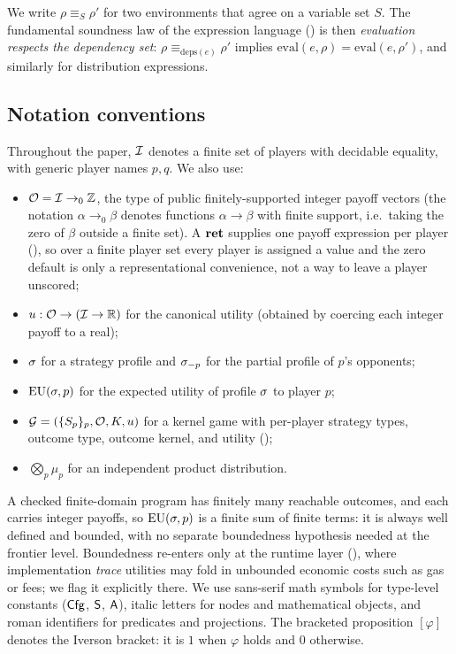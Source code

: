 We write $\rho \mathrel{\equiv_S} \rho'$ for two environments that
agree on a variable set $S$.  The fundamental soundness law of the
expression language () is then
\emph{evaluation respects the dependency set}:
$\rho \mathrel{\equiv_{\mathrm{deps}(e)}} \rho'$ implies
$\mathrm{eval}(e, \rho) = \mathrm{eval}(e, \rho')$, and similarly for
distribution expressions.

\subsection{Notation conventions}
\label{sec:prelim:notation}

Throughout the paper, $\mathcal{I}$ denotes a finite set of players with
decidable equality, with generic player names $p, q$.  We also use:
\begin{itemize}\itemsep1pt
\item $\mathcal{O} = \mathcal{I} \to_0 \mathbb{Z}$, the type of public
  finitely-supported integer payoff vectors (the notation
  $\alpha \to_0 \beta$ denotes functions $\alpha \to \beta$ with
  finite support, i.e.\ taking the zero of $\beta$ outside a
  finite set).  A $\mathbf{ret}$ supplies one payoff expression per player
  (), so over a finite player set every player is
  assigned a value and the zero default is only a representational
  convenience, not a way to leave a player unscored;
\item $u : \mathcal{O} \to (\mathcal{I} \to \mathbb{R})$ for the canonical
  utility (obtained by coercing each integer payoff to a real);
\item $\sigma$ for a strategy profile and $\sigma_{-p}$ for the
  partial profile of $p$'s opponents;
\item $\mathrm{EU}(\sigma, p)$ for the expected utility of profile
  $\sigma$ to player $p$;
\item $\mathcal{G} = (\{S_p\}_p, \mathcal{O}, K, u)$ for a kernel game with
  per-player strategy types, outcome type, outcome kernel, and
  utility ();
\item $\bigotimes_p \mu_p$ for an independent product distribution.
\end{itemize}
A checked finite-domain program has finitely many reachable outcomes, and
each carries integer payoffs, so $\mathrm{EU}(\sigma,p)$ is a finite sum of finite
terms: it is always well defined and bounded, with no separate boundedness
hypothesis needed at the frontier level.  Boundedness re-enters only at the
runtime layer (), where implementation \emph{trace}
utilities may fold in unbounded economic costs such as gas or fees; we flag it
explicitly there.
We use sans-serif math symbols for type-level constants
($\mathsf{Cfg}$, $\mathsf{S}$, $\mathsf{A}$), italic letters for nodes and mathematical
objects, and roman identifiers for predicates and projections.
The bracketed proposition $[\varphi]$ denotes the Iverson bracket: it is
\(1\) when \(\varphi\) holds and \(0\) otherwise.

